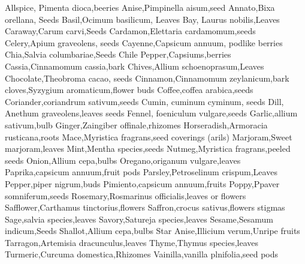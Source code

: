 Allspice, Pimenta dioca,beeries
Anise,Pimpinella aisum,seed
Annato,Bixa orellana, Seeds
Basil,Ocimum basilicum, Leaves
Bay, Laurus nobilis,Leaves
Caraway,Carum carvi,Seeds
Cardamon,Elettaria cardamomum,seeds
Celery,Apium graveolens, seeds
Cayenne,Capsicum annuum, podlike berries
Chia,Salvia columbariae,Seeds
Chile Pepper,Capsiums,berries
Cassia,Cinnamomum cassia,bark
Chives,Allium schoenoprasum,Leaves
Chocolate,Theobroma cacao, seeds
Cinnamon,Cinnamomum zeylanicum,bark
cloves,Syzygium aromaticum,flower buds
Coffee,coffea arabica,seeds
Coriander,coriandrum sativum,seeds
Cumin, cuminum cyminum, seeds
Dill, Anethum graveolens,leaves seeds
Fennel, foeniculum vulgare,seeds
Garlic,allium sativum,bulb
Ginger,Zaingiber offinale,rhizomes
Horseradish,Armoracia rusticana,roots
Mace,Myristica fragrans,seed coverings (arils)
Marjoram,Sweet marjoram,leaves
Mint,Mentha species,seeds
Nutmeg,Myristica fragrans,peeled seeds
Onion,Allium cepa,bulbs
Oregano,origanum vulgare,leaves
Paprika,capsicum annuum,fruit pods
Parsley,Petroselinum crispum,Leaves
Pepper,piper nigrum,buds
Pimiento,capsicum annuum,fruits
Poppy,Ppaver somniferum,seeds
Rosemary,Rosmarinus officialis,leaves or flowers
Safflower,Carthamus tinctorius,flowers
Saffron,crocus sativus,flowers stigmas
Sage,salvia species,leaves
Savory,Satureja species,leaves
Sesame,Sesamum indicum,Seeds
Shallot,Allium cepa,bulbs
Star Anise,Illicium verum,Unripe fruits
Tarragon,Artemisia dracunculus,leaves
Thyme,Thymus species,leaves
Turmeric,Curcuma domestica,Rhizomes
Vainilla,vanilla plnifolia,seed pods
